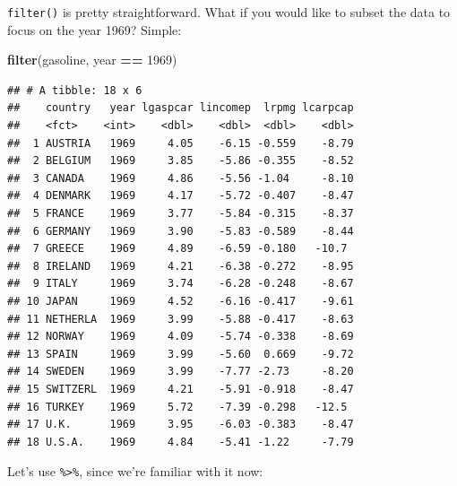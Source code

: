 \documentclass[]{gitbook}
\newenvironment{Shaded}{\begin{snugshade}}{\end{snugshade}}
\newcommand{\DecValTok}[1]{\textcolor[rgb]{0.00,0.00,0.81}{#1}}
\newcommand{\KeywordTok}[1]{\textcolor[rgb]{0.13,0.29,0.53}{\textbf{#1}}}
\newcommand{\NormalTok}[1]{#1}
\newcommand{\OperatorTok}[1]{\textcolor[rgb]{0.81,0.36,0.00}{\textbf{#1}}}
\newcommand{\StringTok}[1]{\textcolor[rgb]{0.31,0.60,0.02}{#1}}
\theoremstyle{definition}
\theoremstyle{definition}
\theoremstyle{definition}
\theoremstyle{remark}
\begin{document}
\texttt{filter()} is pretty straightforward. What if you would like to
subset the data to focus on the year 1969? Simple:

\begin{Shaded}
\begin{Highlighting}[]
\KeywordTok{filter}\NormalTok{(gasoline, year }\OperatorTok{==}\StringTok{ }\DecValTok{1969}\NormalTok{)}
\end{Highlighting}
\end{Shaded}

\begin{verbatim}
## # A tibble: 18 x 6
##    country   year lgaspcar lincomep  lrpmg lcarpcap
##    <fct>    <int>    <dbl>    <dbl>  <dbl>    <dbl>
##  1 AUSTRIA   1969     4.05    -6.15 -0.559    -8.79
##  2 BELGIUM   1969     3.85    -5.86 -0.355    -8.52
##  3 CANADA    1969     4.86    -5.56 -1.04     -8.10
##  4 DENMARK   1969     4.17    -5.72 -0.407    -8.47
##  5 FRANCE    1969     3.77    -5.84 -0.315    -8.37
##  6 GERMANY   1969     3.90    -5.83 -0.589    -8.44
##  7 GREECE    1969     4.89    -6.59 -0.180   -10.7 
##  8 IRELAND   1969     4.21    -6.38 -0.272    -8.95
##  9 ITALY     1969     3.74    -6.28 -0.248    -8.67
## 10 JAPAN     1969     4.52    -6.16 -0.417    -9.61
## 11 NETHERLA  1969     3.99    -5.88 -0.417    -8.63
## 12 NORWAY    1969     4.09    -5.74 -0.338    -8.69
## 13 SPAIN     1969     3.99    -5.60  0.669    -9.72
## 14 SWEDEN    1969     3.99    -7.77 -2.73     -8.20
## 15 SWITZERL  1969     4.21    -5.91 -0.918    -8.47
## 16 TURKEY    1969     5.72    -7.39 -0.298   -12.5 
## 17 U.K.      1969     3.95    -6.03 -0.383    -8.47
## 18 U.S.A.    1969     4.84    -5.41 -1.22     -7.79
\end{verbatim}

Let's use \texttt{\%\textgreater{}\%}, since we're familiar with it now:

\begin{Shaded}
\end{Shaded}
\end{document}
